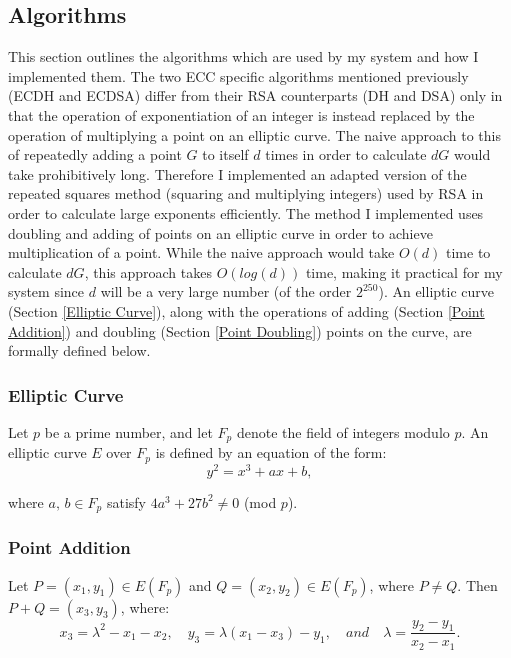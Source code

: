 \documentclass[12pt,a4paper]{article}
\begin{document}
\subsection{Algorithms} \noindent \label{Algorithms}
This section outlines the algorithms which are used by my system and how I implemented them. 
The two ECC specific algorithms mentioned previously (ECDH and ECDSA) differ from their RSA counterparts (DH and DSA) only in that 
the operation of exponentiation of an integer is instead replaced by the operation of multiplying a point on an elliptic curve. 
The naive approach to this of repeatedly adding a point $G$ to itself $d$ times in order to calculate $dG$ would take prohibitively long. 
Therefore I implemented an adapted version of the repeated squares method (squaring and multiplying integers) 
used by RSA in order to calculate large exponents efficiently. 
The method I implemented uses doubling and adding of points on an elliptic curve in order to achieve multiplication of a point. 
While the naive approach would take $O(d)$ time to calculate $dG$, this approach takes $O(log(d))$ time, 
making it practical for my system since $d$ will be a very large number (of the order $2^{250}$). 
An elliptic curve (Section \ref{Elliptic Curve}), along with the operations of adding (Section \ref{Point Addition}) 
and doubling (Section \ref{Point Doubling}) points on the curve, are formally defined below. 

\subsubsection{Elliptic Curve} \noindent \label{Elliptic Curve}
Let $p$ be a prime number, and let $F_p$ denote the field of integers modulo $p$. 
An elliptic curve $E$ over $F_p$ is defined by an equation of the form:
\begin{equation}
y^2 = x^3 + ax + b,
\end{equation}

where $a,\, b \in F_p$ satisfy $4a^3 + 27b^2 \ne 0$ (mod $ p$).

\subsubsection{Point Addition} \noindent \label{Point Addition}
Let $P = (x_1,y_1) \in E(F_p)$ and $Q = (x_2,y_2) \in E(F_p)$, where $P \neq Q$. 
Then $P + Q = (x_3,y_3)$, where:
\begin{equation}
    x_3 = \lambda^2 - x_1 - x_2, \quad y_3 = \lambda(x_1 - x_3) - y_1, \quad and \quad \lambda = \frac{y_2-y_1}{x_2-x_1}.
\end{equation}
\end{document}
